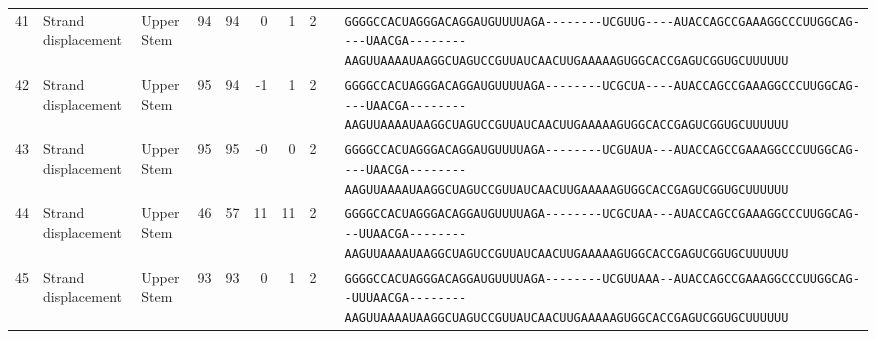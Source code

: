 \begin{tabular}{rllrrrrrcl}
 41 & Strand displacement & Upper Stem & 94 & 94 & 0 & 1 & 2 &  &
 \color{ucsfdarkgrey}\verb|GGGGCCACUAGGGACAGGAU|\color{ucsforange}\verb|GUUUUA|\color{ucsfblue}\verb|GA--------UCGUUG----|\color{ucsfpurple}\verb|AUACCAGCCGAAAGGCCCUUGGCAG|\color{ucsfblue}\verb|----UAACGA--------AAGU|\color{ucsforange}\verb|UAAAAUAA|\color{ucsfnavy}\verb|GGCUAGUCC|\color{ucsforange}\verb|GUUAUCA|\color{ucsfteal}\verb|ACUUGAAAAAGUG|\color{ucsforange}\verb|GCACCGAGUCGGUGCUUUUUU| \\

 42 & Strand displacement & Upper Stem & 95 & 94 & -1 & 1 & 2 &  &
 \color{ucsfdarkgrey}\verb|GGGGCCACUAGGGACAGGAU|\color{ucsforange}\verb|GUUUUA|\color{ucsfblue}\verb|GA--------UCGCUA----|\color{ucsfpurple}\verb|AUACCAGCCGAAAGGCCCUUGGCAG|\color{ucsfblue}\verb|----UAACGA--------AAGU|\color{ucsforange}\verb|UAAAAUAA|\color{ucsfnavy}\verb|GGCUAGUCC|\color{ucsforange}\verb|GUUAUCA|\color{ucsfteal}\verb|ACUUGAAAAAGUG|\color{ucsforange}\verb|GCACCGAGUCGGUGCUUUUUU| \\

 43 & Strand displacement & Upper Stem & 95 & 95 & -0 & 0 & 2 &  &
 \color{ucsfdarkgrey}\verb|GGGGCCACUAGGGACAGGAU|\color{ucsforange}\verb|GUUUUA|\color{ucsfblue}\verb|GA--------UCGUAUA---|\color{ucsfpurple}\verb|AUACCAGCCGAAAGGCCCUUGGCAG|\color{ucsfblue}\verb|----UAACGA--------AAGU|\color{ucsforange}\verb|UAAAAUAA|\color{ucsfnavy}\verb|GGCUAGUCC|\color{ucsforange}\verb|GUUAUCA|\color{ucsfteal}\verb|ACUUGAAAAAGUG|\color{ucsforange}\verb|GCACCGAGUCGGUGCUUUUUU| \\

 44 & Strand displacement & Upper Stem & 46 & 57 & 11 & 11 & 2 &  &
 \color{ucsfdarkgrey}\verb|GGGGCCACUAGGGACAGGAU|\color{ucsforange}\verb|GUUUUA|\color{ucsfblue}\verb|GA--------UCGCUAA---|\color{ucsfpurple}\verb|AUACCAGCCGAAAGGCCCUUGGCAG|\color{ucsfblue}\verb|---UUAACGA--------AAGU|\color{ucsforange}\verb|UAAAAUAA|\color{ucsfnavy}\verb|GGCUAGUCC|\color{ucsforange}\verb|GUUAUCA|\color{ucsfteal}\verb|ACUUGAAAAAGUG|\color{ucsforange}\verb|GCACCGAGUCGGUGCUUUUUU| \\

 45 & Strand displacement & Upper Stem & 93 & 93 & 0 & 1 & 2 &  &
 \color{ucsfdarkgrey}\verb|GGGGCCACUAGGGACAGGAU|\color{ucsforange}\verb|GUUUUA|\color{ucsfblue}\verb|GA--------UCGUUAAA--|\color{ucsfpurple}\verb|AUACCAGCCGAAAGGCCCUUGGCAG|\color{ucsfblue}\verb|--UUUAACGA--------AAGU|\color{ucsforange}\verb|UAAAAUAA|\color{ucsfnavy}\verb|GGCUAGUCC|\color{ucsforange}\verb|GUUAUCA|\color{ucsfteal}\verb|ACUUGAAAAAGUG|\color{ucsforange}\verb|GCACCGAGUCGGUGCUUUUUU| \\


\end{tabular}
